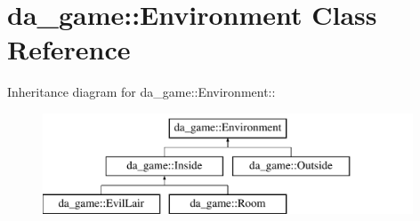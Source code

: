 \hypertarget{classda__game_1_1Environment}{
\section{da\_\-game::Environment Class Reference}
\label{classda__game_1_1Environment}
}
Inheritance diagram for da\_\-game::Environment::\begin{figure}[H]
\begin{center}
\leavevmode
\includegraphics[height=3cm]{classda__game_1_1Environment}
\end{center}
\end{figure}
